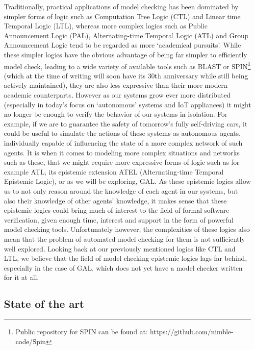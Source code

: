 Traditionally, practical applications of model checking has been dominated by simpler forms of logic such as Computation Tree Logic (CTL) and Linear time Temporal Logic (LTL), whereas more complex logics such as Public Announcement Logic (PAL), Alternating-time Temporal Logic (ATL) and Group Announcement Logic tend to be regarded as more `academical pursuits'. While these simpler logics have the obvious advantage of being far simpler to efficiently model check, leading to a wide variety of available tools such as BLAST or SPIN\footnote{Public repository for SPIN can be found at: https://github.com/nimble-code/Spin} (which at the time of writing will soon have its 30th anniversary while still being actively maintained), they are also less expressive than their more modern academic counterparts. However as our systems grow ever more distributed (especially in today's focus on `autonomous' systems and IoT appliances) it might no longer be enough to verify the behavior of our systems in isolation. For example, if we are to guarantee the safety of tomorrow's fully self-driving cars, it could be useful to simulate the actions of these systems as autonomous agents, individually capable of influencing the state of a more complex network of such agents. It is when it comes to modeling more complex situations and networks such as these, that we might require more expressive forms of logic such as for example ATL, its epistemic extension ATEL (Alternating-time Temporal Epistemic Logic), or as we will be exploring, GAL. As these epistemic logics allow us to not only reason around the knowledge of each agent in our systems, but also their knowledge of other agents' knowledge, it makes sense that these epistemic logics could bring much of interest to the field of formal software verification, given enough time, interest and support in the form of powerful model checking tools. Unfortunately however, the complexities of these logics also mean that the problem of automated model checking for them is not sufficiently well explored. Looking back at our previously mentioned logics like CTL and LTL, we believe that the field of model checking epistemic logics lags far behind, especially in the case of GAL, which does not yet have a model checker written for it at all. 

\subsection{State of the art}

